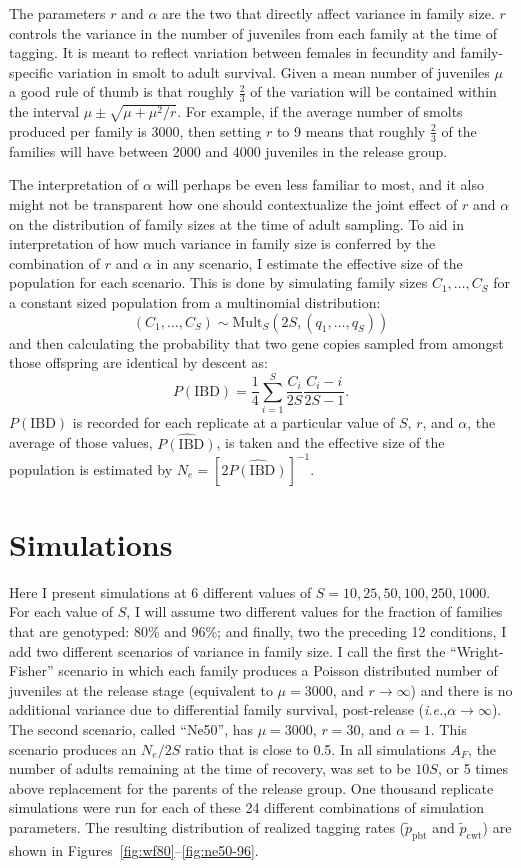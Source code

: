 \documentclass[11pt]{article}
\newcommand{\ie}{{\em i.e.},\xspace }
\begin{document}
The parameters $r$ and $\alpha$ are the two that directly affect variance in family size.  $r$ 
controls the variance in the number of juveniles from each family at the time of tagging.  It is meant
to reflect variation between females in fecundity and family-specific variation in smolt to adult survival.  
Given a mean number of juveniles $\mu$ a good rule of thumb is that roughly $\frac{2}{3}$ 
of the variation will be contained
within the interval $\mu \pm \sqrt{\mu + \mu^2/r}$.  For example, if the average number of smolts produced
per family is 3000, then setting $r$ to 9 means that roughly $\frac{2}{3}$ of the families will have
between 2000 and 4000 juveniles in the release group.


The interpretation of $\alpha$ will perhaps be even less familiar to most, and it also might not
be transparent how one should contextualize the joint effect of $r$ and $\alpha$ on the distribution
of family sizes at the time of adult sampling.  To aid in interpretation of how much variance in
family size is conferred by the combination of $r$ and $\alpha$ in any scenario, I estimate the
effective size of the population for each scenario.  This is done by simulating family sizes $C_1,\ldots,C_S$
for a constant sized population from a multinomial distribution:
\[
(C_1,\ldots, C_S) \sim \mathrm{Mult}_S(2S, (q_1, \ldots, q_S))
\]
and then calculating the probability that two gene copies sampled from amongst those offspring
are identical by descent as:
\[
P(\mathrm{IBD}) = \frac{1}{4}\sum_{i=1}^S \frac{C_i}{2S}\frac{C_i - i}{2S - 1}.
\]
$P(\mathrm{IBD})$ is recorded for each replicate at a particular value of $S$, $r$, and $\alpha$, the average
of those values, $\widehat{P(\mathrm{IBD})}$, is taken and the effective size of the population is estimated
by $N_e = [2\widehat{P(\mathrm{IBD})}]^{-1}$. 

\section{Simulations}
Here I present simulations at 6 different values of $S = 10, 25, 50, 100, 250, 1000$.  For each value of $S$,
I will assume two different values for the fraction of families that are genotyped: 80\% and 96\%; and 
finally, two the preceding 12 conditions, I add two different scenarios of variance in family size. I call
the first the ``Wright-Fisher'' scenario in which each family produces a Poisson distributed number of
juveniles at the release stage (equivalent to $\mu=3000$, and $r\rightarrow\infty$) and there is no
additional variance due to differential family 
survival, post-release (\ie $\alpha \rightarrow \infty$). The second scenario, called ``Ne50'', has
$\mu = 3000$, $r = 30$, and $\alpha = 1$.  This scenario produces an $N_e/2S$ ratio that is close to
0.5.  In all simulations $A_F$, the number of adults remaining at the time of recovery, was set to 
be $10S$, or 5 times above replacement for the parents of the release group. One thousand replicate simulations were run for each of these 24 different combinations of simulation parameters. The resulting distribution of realized tagging
rates ($\tilde{p}_\mathrm{pbt}$ and $\tilde{p}_\mathrm{cwt}$)
are shown in Figures~\ref{fig:wf80}--\ref{fig:ne50-96}.
\end{document}
